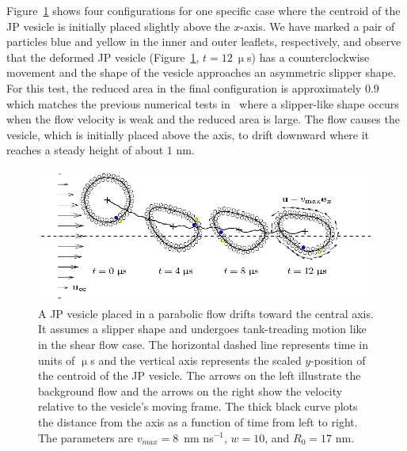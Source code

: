 \documentclass[lineno]{jfm}
\begin{document}

Figure~\ref{figure6} shows four configurations for one specific case
where the centroid of the JP vesicle is initially placed slightly above
the $x$-axis. We have marked a pair of particles blue and yellow in the
inner and outer leaflets, respectively, and observe that the deformed JP
vesicle (Figure~\ref{figure6}, $t = 12~\upmu$s) has a counterclockwise
movement and the shape of the vesicle approaches an asymmetric slipper
shape. For this test, the reduced area in the final configuration is
approximately $0.9$ which matches the previous numerical tests
in~\cite{Kaoui09} where a slipper-like shape occurs when the flow
velocity is weak and the reduced area is large. The flow causes the
vesicle, which is initially placed above the axis, to drift downward
where it reaches a steady height of about $1$ nm. 

\begin{figure}
\centering
\includegraphics[width=\textwidth]{fig6.eps}
  \caption{\label{figure6} A JP vesicle placed in a parabolic flow
  drifts toward the central axis. It assumes a slipper shape and
  undergoes tank-treading motion like in the shear flow case. 
The horizontal dashed line represents time in units of
    $\upmu$s and the vertical axis represents the scaled $y$-position
    of the centroid of the JP vesicle.
  The arrows
  on the left illustrate the background flow and the arrows on the right
  show the velocity relative to the vesicle's moving frame. The thick
  black curve plots the distance from the axis as a function of time
  from left to right. The parameters are $v_{max} = 8$~nm ns$^{-1}$,
  $w=10$, and $R_0=17$ nm.}
\end{figure}
\end{document}
